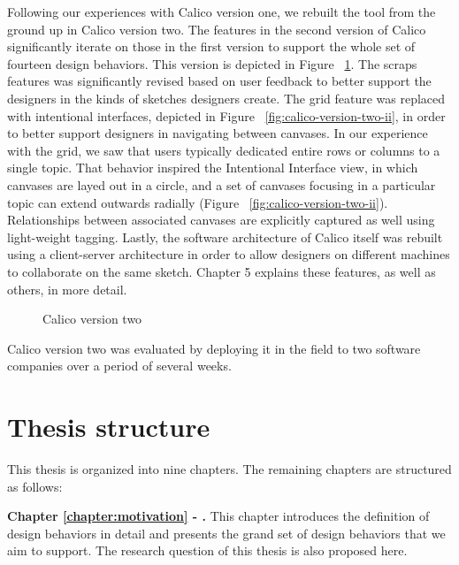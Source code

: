 Following our experiences with Calico version one, we rebuilt the tool from the ground up in Calico version two. The features in the second version of Calico significantly iterate on those in the first version to support the whole set of fourteen design behaviors. This version is depicted in Figure ~\ref{fig:calico-version-two}. The scraps features was significantly revised based on user feedback to better support the designers in the kinds of sketches designers create. The grid feature was replaced with intentional interfaces, depicted in Figure ~\ref{fig:calico-version-two-ii}, in order to better support designers in navigating between canvases. In our experience with the grid, we saw that users typically dedicated entire rows or columns to a single topic. That behavior inspired the Intentional Interface view, in which canvases are layed out in a circle, and a set of canvases focusing in a particular topic can extend outwards radially (Figure ~\ref{fig:calico-version-two-ii}). Relationships between associated canvases are explicitly captured as well using light-weight tagging. Lastly, the software architecture of Calico itself was rebuilt using a client-server architecture in order to allow designers on different machines to collaborate on the same sketch. Chapter 5 explains these features, as well as others, in more detail.

\begin{figure}
  \centering
   \caption {Calico version two}
   \label{fig:calico-version-two}
\end{figure}

Calico version two was evaluated by deploying it in the field to two software companies over a period of several weeks. 

\section{Thesis structure}

This thesis is organized into nine chapters. The remaining chapters are structured as follows:

\textbf{Chapter \ref{chapter:motivation} - .} This chapter introduces the definition of design behaviors in detail and presents the grand set of design behaviors that we aim to support. The research question of this thesis is also proposed here.

